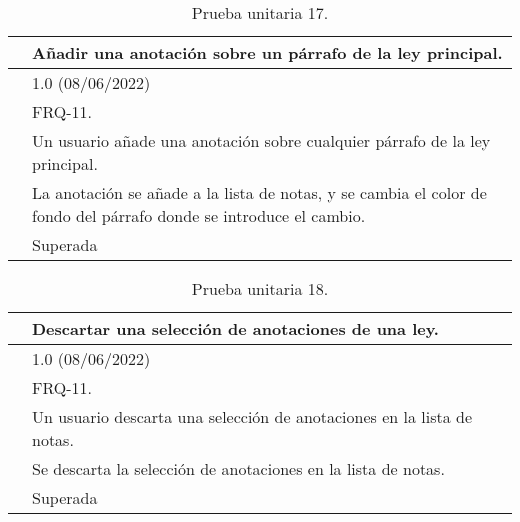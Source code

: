 \begin{table}[H]
\begin{center}
\begin{tabular}{|p{3cm}|p{10cm}|} \hline
\centering {\bf PU-17} & Añadir una anotación sobre un párrafo de la ley principal.  \\ \hline\hline
\centering {\bf Versión} & 1.0 (08/06/2022) \\ \hline
\centering {\bf Dependencias} & FRQ-11. \\ \hline
\centering {\bf Descripción} &  Un usuario añade una anotación sobre cualquier párrafo de la ley principal. \\ \hline
\centering {\bf Criterio de aceptación} & La anotación se añade a la lista de notas, y se cambia el color de fondo del párrafo donde se introduce el cambio. \\ \hline
\centering {\bf Estado} & Superada \\ \hline
\end{tabular}
\caption{Prueba unitaria 17.}
\label{enlacePU17}
\end{center}
\end{table}

\begin{table}[H]
\begin{center}
\begin{tabular}{|p{3cm}|p{10cm}|} \hline
\centering {\bf PU-18} & Descartar una selección de anotaciones de una ley.  \\ \hline\hline
\centering {\bf Versión} & 1.0 (08/06/2022) \\ \hline
\centering {\bf Dependencias} & FRQ-11. \\ \hline
\centering {\bf Descripción} &  Un usuario descarta una selección de anotaciones en la lista de notas. \\ \hline
\centering {\bf Criterio de aceptación} & Se descarta la selección de anotaciones en la lista de notas. \\ \hline
\centering {\bf Estado} & Superada \\ \hline
\end{tabular}
\caption{Prueba unitaria 18.}
\label{enlacePU18}
\end{center}
\end{table}

